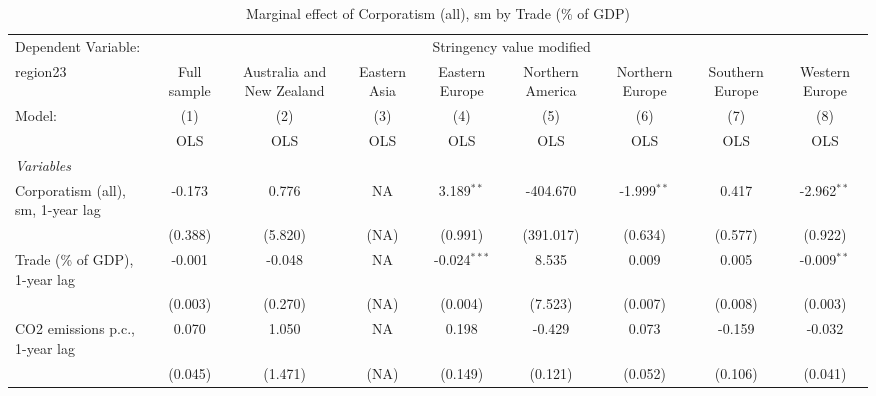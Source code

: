 
\begin{table}[htbp]
   \caption{Marginal effect of Corporatism (all), sm by Trade (\% of GDP)}
   \centering
   \begin{tabular}{lcccccccc}
      \toprule
      Dependent Variable: & \multicolumn{8}{c}{Stringency value modified}\\
      region23                                                           & Full sample   & Australia and New Zealand & Eastern Asia & Eastern Europe & Northern America & Northern Europe & Southern Europe & Western Europe \\   
      Model:                                                             & (1)           & (2)                       & (3)          & (4)            & (5)              & (6)             & (7)             & (8)\\  
                                                                         &  OLS          & OLS                       & OLS          & OLS            & OLS              & OLS             & OLS             & OLS\\  
      \midrule
      \emph{Variables}\\
      Corporatism (all), sm, 1-year lag                                  & -0.173        & 0.776                     & NA           & 3.189$^{**}$   & -404.670         & -1.999$^{**}$   & 0.417           & -2.962$^{**}$\\   
                                                                         & (0.388)       & (5.820)                   & (NA)         & (0.991)        & (391.017)        & (0.634)         & (0.577)         & (0.922)\\   
      Trade (\% of GDP), 1-year lag                                      & -0.001        & -0.048                    & NA           & -0.024$^{***}$ & 8.535            & 0.009           & 0.005           & -0.009$^{**}$\\   
                                                                         & (0.003)       & (0.270)                   & (NA)         & (0.004)        & (7.523)          & (0.007)         & (0.008)         & (0.003)\\   
      CO2 emissions p.c., 1-year lag                                     & 0.070         & 1.050                     & NA           & 0.198          & -0.429           & 0.073           & -0.159          & -0.032\\   
                                                                         & (0.045)       & (1.471)                   & (NA)         & (0.149)        & (0.121)          & (0.052)         & (0.106)         & (0.041)\\   

\end{tabular}
\end{table}
